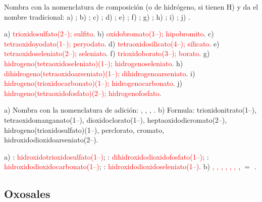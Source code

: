 \begin{exercise}
    Nombra con la nomenclatura de composición (o de hidrógeno, si tienen H) y da el nombre tradicional: a) ; b)
    ; c) ; d) ; e) ; f) ; g) ; h) ; i) ;
    j) .
    \begin{solu}
        a) \textcolor{red}{trioxidosulfato(2\nobreakdash--); sulfito}. b) \textcolor{red}{oxidobromato(1\nobreakdash--); hipobromito}. c)
        \textcolor{red}{tetraoxidoyodato(1\nobreakdash--); peryodato}. d) \textcolor{red}{tetraoxidosilicato(4\nobreakdash--); silicato}. e)
        \textcolor{red}{tetraoxidoseleniato(2\nobreakdash--); seleniato}. f) \textcolor{red}{trioxidoborato(3\nobreakdash--); borato}. g)
        \textcolor{red}{hidrogeno(tetraoxidoseleniato)(1\nobreakdash--); hidrogenoseleniato}. h)
        \textcolor{red}{dihidrogeno(tetraoxidoarseniato)(1\nobreakdash--); dihidrogenoarseniato}. i)
        \textcolor{red}{hidrogeno(trioxidocarbonato)(1\nobreakdash--); hidrogenocarbonato}. j)
        \textcolor{red}{hidrogeno(tetraoxidofosfato)(2\nobreakdash--); hidrogenofosfato}.
    \end{solu}
\end{exercise}

\begin{exercise}
    a) Nombra con la nomenclatura de adición: , , , . b) Formula: trioxidonitrato(1\nobreakdash--),
    tetraoxidomanganato(1\nobreakdash--), dioxidoclorato(1\nobreakdash--), heptaoxidodicromato(2\nobreakdash--), hidrogeno(trioxidosulfato)(1\nobreakdash--), perclorato,
    cromato, hidroxidodioxidoarseniato(2\nobreakdash--).
    \begin{solu}
        a) : \textcolor{red}{hidroxidotrioxidosulfato(1\nobreakdash--)}; : \textcolor{red}{dihidroxidodioxidofosfato(1\nobreakdash--)};
        : \textcolor{red}{hidroxidodioxidocarbonato(1\nobreakdash--)}; :
        \textcolor{red}{hidroxidodioxidoseleniato(1\nobreakdash--)}. b) \textcolor{red}{, , , ,
        , , },  \(=\) \textcolor{red}{}.
    \end{solu}
\end{exercise}

\subsection{Oxosales}\label{sec:ud5-oxosales}

